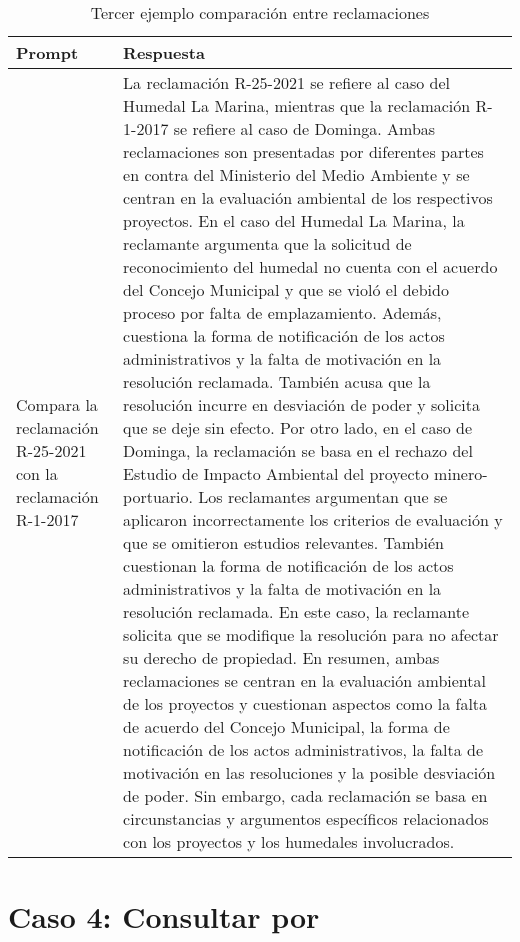 \begin{table}[ht!]
    \centering
    \caption[Ejemplo: Tercero Prompt]{Tercer ejemplo comparación entre reclamaciones}
    \begin{tabular}{p{3cm}p{12cm}}
        \toprule
        \textbf{Prompt} & \textbf{Respuesta} \\
        \hline\hline
        Compara la reclamación R-25-2021 con la reclamación R-1-2017& La reclamación R-25-2021 se refiere al caso del Humedal La Marina, mientras que la reclamación R-1-2017 se refiere al caso de Dominga. Ambas reclamaciones son presentadas por diferentes partes en contra del Ministerio del Medio Ambiente y se centran en la evaluación ambiental de los respectivos proyectos. En el caso del Humedal La Marina, la reclamante argumenta que la solicitud de reconocimiento del humedal no cuenta con el acuerdo del Concejo Municipal y que se violó el debido proceso por falta de emplazamiento. Además, cuestiona la forma de notificación de los actos administrativos y la falta de motivación en la resolución reclamada. También acusa que la resolución incurre en desviación de poder y solicita que se deje sin efecto. Por otro lado, en el caso de Dominga, la reclamación se basa en el rechazo del Estudio de Impacto Ambiental del proyecto minero-portuario. Los reclamantes argumentan que se aplicaron incorrectamente los criterios de evaluación y que se omitieron estudios relevantes. También cuestionan la forma de notificación de los actos administrativos y la falta de motivación en la resolución reclamada. En este caso, la reclamante solicita que se modifique la resolución para no afectar su derecho de propiedad. En resumen, ambas reclamaciones se centran en la evaluación ambiental de los proyectos y cuestionan aspectos como la falta de acuerdo del Concejo Municipal, la forma de notificación de los actos administrativos, la falta de motivación en las resoluciones y la posible desviación de poder. Sin embargo, cada reclamación se basa en circunstancias y argumentos específicos relacionados con los proyectos y los humedales involucrados.\\
        \bottomrule
    \end{tabular}
    \label{tb1:prompt1}
\end{table}

\section{Caso 4: Consultar por }


